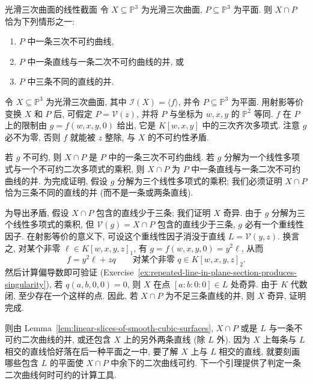\begin{Lemma}{光滑三次曲面的线性截面}\leavevmode\label{lem:linear-slices-of-smooth-cubic-surfaces}
令 $X\subseteq\mathbb{P}^{3}$ 为光滑三次曲面, $P\subseteq\mathbb{P}^{3}$ 为平面. 则 $X\cap P$ 恰为下列情形之一:
\begin{enumerate}[label=(\roman*),ref=\roman*]
  \item $P$ 中一条三次不可约曲线,
  \item $P$ 中一条直线与一条二次不可约曲线的并, 或
  \item\label{part:linear-slice-three-distinct-lines} $P$ 中三条不同的直线的并.
\end{enumerate}
\end{Lemma}
\begin{Proof}
令 $X\subseteq\mathbb{P}^{3}$ 为光滑三次曲面, 其中 $\mathcal{I}(X)=\langle f\rangle$, 并令 $P\subseteq\mathbb{P}^{3}$ 为平面. 用射影等价变换 $X$ 和 $P$ 后, 可假定 $P=\mathcal{V}(z)$, 并将 $P$ 与坐标为 $w,x,y$ 的 $\mathbb{P}^{2}$ 等同. $f$ 在 $P$ 上的限制由 $g=f(w,x,y,0)$ 给出, 它是 $K[w,x,y]$ 中的三次齐次多项式. 注意 $g$ 必不为零, 否则 $f$ 就能被 $z$ 整除, 与 $X$ 的不可约性矛盾.

若 $g$ 不可约, 则 $X\cap P$ 是 $P$ 中的一条三次不可约曲线. 若 $g$ 分解为一个线性多项式与一个不可约二次多项式的乘积, 则 $X\cap P$ 为 $P$ 中一条直线与一条二次不可约曲线的并. 为完成证明, 假设 $g$ 分解为三个线性多项式的乘积; 我们必须证明 $X\cap P$ 恰为三条不同的直线的并 (而不是一条或两条直线).

为导出矛盾, 假设 $X\cap P$ 包含的直线少于三条; 我们证明 $X$ 奇异. 由于 $g$ 分解为三个线性多项式的乘积, 但 $\mathcal{V}(g)=X\cap P$ 包含的直线少于三条, $g$ 必有一个重线性因子. 在射影等价的意义下, 可设这个重线性因子消没于直线 $L=\mathcal{V}(y,z)$. 换言之, 对某个非零 $\ell\in K[w,x,y,z]_{1}$, 有 $g=f(w,x,y,0)=y^{2}\ell$, 从而
\[
  f=y^{2}\ell+zq\qquad\text{对某个非零 }q\in K[w,x,y,z]_{2}.
\]
然后计算偏导数即可验证 (Exercise~\ref{ex:repeated-line-in-plane-section-produces-singularity}), 若 $q(a,b,0,0)=0$, 则 $X$ 在点 $[a:b:0:0]\in L$ 处奇异. 由于 $K$ 代数闭, 至少存在一个这样的点. 因此, 若 $X\cap P$ 为不足三条直线的并, 则 $X$ 奇异, 证明完成.
\end{Proof}

则由 Lemma~\ref{lem:linear-slices-of-smooth-cubic-surfaces}, $X\cap P$ 或是 $L$ 与一条不可约二次曲线的并, 或还包含 $X$ 上的另外两条直线 (除 $L$ 外). 因为 $X$ 上每条与 $L$ 相交的直线恰好落在后一种平面之一中, 要了解 $X$ 上与 $L$ 相交的直线, 就要刻画哪些包含 $L$ 的平面使 $X\cap P$ 中余下的二次曲线可约. 下一个引理提供了判定一条二次曲线何时可约的计算工具.

